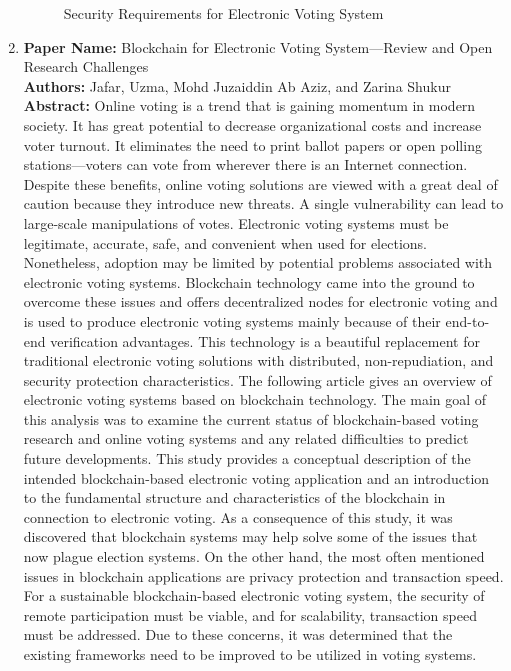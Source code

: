 \documentclass[oneside, 12pt]{book}
\begin{document}
\begin{enumerate}
\begin{figure}[H]
					    \caption{Security Requirements for Electronic Voting System}
					    \label{fig:security-requirements}
					\end{figure}
				\item
					\textbf{Paper Name:} Blockchain for Electronic Voting System—Review and Open Research Challenges \cite{jafar2021blockchain}\\
					\textbf{Authors:} Jafar, Uzma, Mohd Juzaiddin Ab Aziz, and Zarina Shukur\\
					\textbf{Abstract:} Online voting is a trend that is gaining momentum in modern society. It has great potential to decrease organizational costs and increase voter turnout. It eliminates the need to print ballot papers or open polling stations—voters can vote from wherever there is an Internet connection. Despite these benefits, online voting solutions are viewed with a great deal of caution because they introduce new threats. A single vulnerability can lead to large-scale manipulations of votes. Electronic voting systems must be legitimate, accurate, safe, and convenient when used for elections. Nonetheless, adoption may be limited by potential problems associated with electronic voting systems. Blockchain technology came into the ground to overcome these issues and offers decentralized nodes for electronic voting and is used to produce electronic voting systems mainly because of their end-to-end verification advantages. This technology is a beautiful replacement for traditional electronic voting solutions with distributed, non-repudiation, and security protection characteristics. The following article gives an overview of electronic voting systems based on blockchain technology. The main goal of this analysis was to examine the current status of blockchain-based voting research and online voting systems and any related difficulties to predict future developments. This study provides a conceptual description of the intended blockchain-based electronic voting application and an introduction to the fundamental structure and characteristics of the blockchain in connection to electronic voting. As a consequence of this study, it was discovered that blockchain systems may help solve some of the issues that now plague election systems. On the other hand, the most often mentioned issues in blockchain applications are privacy protection and transaction speed. For a sustainable blockchain-based electronic voting system, the security of remote participation must be viable, and for scalability, transaction speed must be addressed. Due to these concerns, it was determined that the existing frameworks need to be improved to be utilized in voting systems.\\

\end{enumerate}
\end{document}
